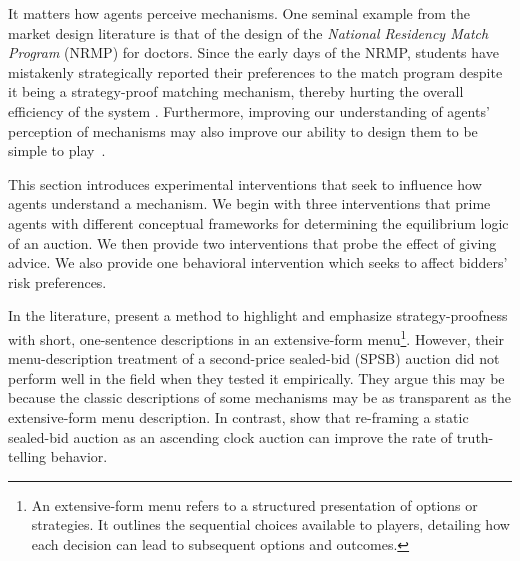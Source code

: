 \documentclass{article} %
\newcommand{\kibitz}[2]{\ifnum\Comments=1{\color{#1}{#2}}\fi}
\newcommand{\dcp}[1]{\kibitz{teal}{[DCP: #1]}}
\begin{document}
It matters how agents perceive mechanisms. One seminal example from the market design literature is that of the design of the {\em National Residency Match Program} (NRMP) for doctors. Since the early days of the NRMP, students have mistakenly strategically reported their preferences to the match program despite it being a strategy-proof matching mechanism, thereby hurting the overall efficiency of the system \citep{roth1999redesign, rees2018suboptimal}. Furthermore, improving our understanding of agents' perception of mechanisms may also improve our ability to design them 
to be simple to play~\cite{li2024designing}. 


This section introduces experimental interventions that seek to influence how agents understand a mechanism. We begin with three interventions that prime agents with different conceptual frameworks for determining the equilibrium logic of an auction. 
We then provide two interventions that probe the effect of giving advice. We also provide one behavioral intervention which seeks to affect bidders' risk preferences. 




In the literature, \citet{gonczarowski2023strategyproofness} present a method to highlight and emphasize strategy-proofness with short, one-sentence descriptions in an extensive-form menu\footnote{An extensive-form menu refers to a structured presentation of options or strategies. It outlines the sequential choices available to players, detailing how each decision can lead to subsequent options and outcomes.}. 
However, their menu-description treatment of a second-price sealed-bid (SPSB) auction did not perform well in the field when they tested it empirically. They argue this may be because the classic descriptions of some mechanisms may be as transparent as the extensive-form menu description.
In contrast, \citet{breitmoser2022obviousness} show that re-framing  a static sealed-bid auction as an ascending clock auction can improve the rate of truth-telling behavior. 
\end{document}
